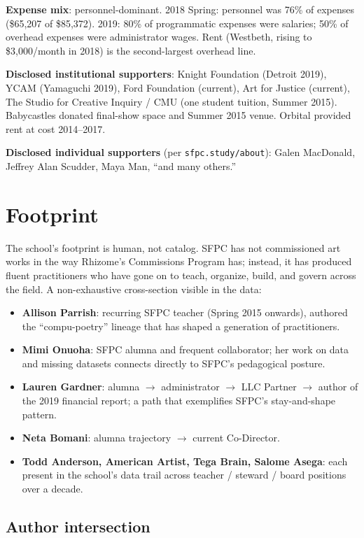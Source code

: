 \documentclass[10pt,letterpaper,twocolumn]{article}
\begin{document}
\textbf{Expense mix}: personnel-dominant. 2018 Spring: personnel was 76\% of expenses (\$65,207 of \$85,372). 2019: 80\% of programmatic expenses were salaries; 50\% of overhead expenses were administrator wages. Rent (Westbeth, rising to \$3,000/month in 2018) is the second-largest overhead line.

\textbf{Disclosed institutional supporters}: Knight Foundation (Detroit 2019), YCAM (Yamaguchi 2019), Ford Foundation (current), Art for Justice (current), The Studio for Creative Inquiry / CMU (one student tuition, Summer 2015). Babycastles donated final-show space and Summer 2015 venue. Orbital provided rent at cost 2014--2017.

\textbf{Disclosed individual supporters} (per \texttt{sfpc.study/about}): Galen MacDonald, Jeffrey Alan Scudder, Maya Man, ``and many others.''

\section{Footprint}

The school's footprint is human, not catalog. SFPC has not commissioned art works in the way Rhizome's Commissions Program has; instead, it has produced fluent practitioners who have gone on to teach, organize, build, and govern across the field. A non-exhaustive cross-section visible in the data:

\begin{itemize}
\item \textbf{Allison Parrish}: recurring SFPC teacher (Spring 2015 onwards), authored the ``compu-poetry'' lineage that has shaped a generation of practitioners.
\item \textbf{Mimi Onuoha}: SFPC alumna and frequent collaborator; her work on data and missing datasets connects directly to SFPC's pedagogical posture.
\item \textbf{Lauren Gardner}: alumna $\to$ administrator $\to$ LLC Partner $\to$ author of the 2019 financial report; a path that exemplifies SFPC's stay-and-shape pattern.
\item \textbf{Neta Bomani}: alumna trajectory $\to$ current Co-Director.
\item \textbf{Todd Anderson, American Artist, Tega Brain, Salome Asega}: each present in the school's data trail across teacher / steward / board positions over a decade.
\end{itemize}

\subsection{Author intersection}
\end{document}
